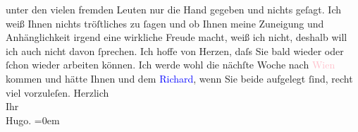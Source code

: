                unter den vielen fremden Leuten nur die Hand gegeben und nichts geſagt. Ich weiß
               Ihnen {\pb}nichts tröſtliches zu ſagen
               und ob Ihnen meine Zuneigung und Anhänglichkeit irgend eine wirkliche Freude macht,
               weiß ich nicht, deshalb will ich auch nicht davon ſprechen. Ich hoffe von Herzen,
               daſs Sie bald wieder oder ſchon wieder arbeiten können. Ich werde {\pb}wohl die nächſte Woche nach \textcolor{pink}{Wien}{}\ledrightnote{\textcolor{pink}{Wien}} kommen und hätte Ihnen und dem \textcolor{blue}{Richard}{}\ledrightnote{\textcolor{blue}{Richard Beer-Hofmann}}, wenn Sie beide aufgelegt ſind, recht viel
               vorzuleſen.\pend
           \pstart
           Herzlich{\\[\baselineskip]}Ihr{\\[\baselineskip]}\spacefill\mbox{Hugo.}\pend
           \leftskip=0em{}\endnumbering{}  
      